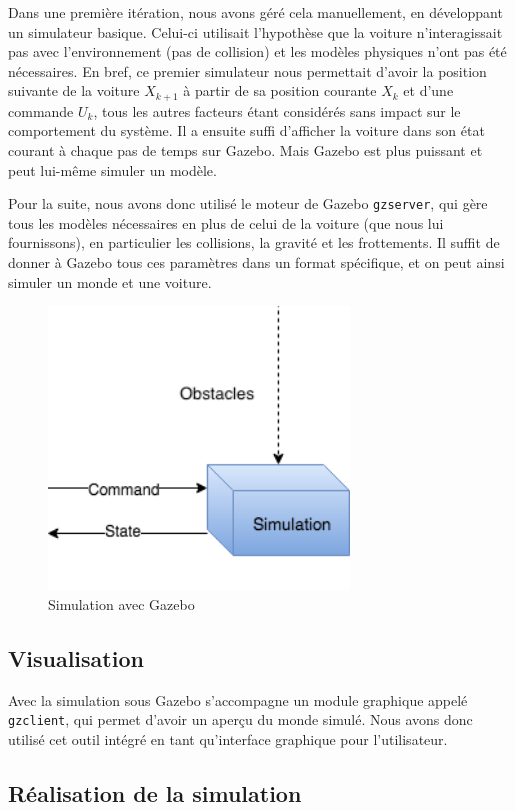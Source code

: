 \documentclass[a4paper,12pt]{report}
\begin{document}
Dans une première itération, nous avons géré cela manuellement, en développant un simulateur basique. Celui-ci utilisait l'hypothèse que la voiture n'interagissait pas avec l'environnement (pas de collision) et les modèles physiques n'ont pas été nécessaires. En bref, ce premier simulateur nous permettait d'avoir la position suivante de la voiture $X_{k+1}$ à partir de sa position courante $X_k$ et d'une commande $U_k$, tous les autres facteurs étant considérés sans impact sur le comportement du système. Il a ensuite suffi d'afficher la voiture dans son état courant à chaque pas de temps sur Gazebo. Mais Gazebo est plus puissant et peut lui-même simuler un modèle.

Pour la suite, nous avons donc utilisé le moteur de Gazebo \texttt{gzserver}, qui gère tous les modèles nécessaires en plus de celui de la voiture (que nous lui fournissons), en particulier les collisions, la gravité et les frottements. Il suffit de donner à Gazebo tous ces paramètres dans un format spécifique, et on peut ainsi simuler un monde et une voiture.

\begin{figure}[!htb]
\centering
\includegraphics[width=8cm]{simulation.png}
\caption{Simulation avec Gazebo}
\end{figure}




\subsection{Visualisation}
Avec la simulation sous Gazebo s'accompagne un module graphique appelé \texttt{gzclient}, qui permet d'avoir un aperçu du monde simulé. Nous avons donc utilisé cet outil intégré en tant qu'interface graphique pour l'utilisateur.


\subsection{Réalisation de la simulation}
\end{document}
